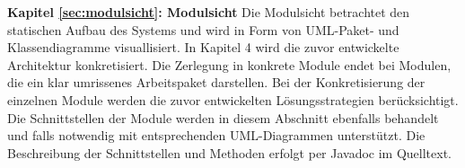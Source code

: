 \textbf{Kapitel \ref{sec:modulsicht}: Modulsicht} %
{Die Modulsicht betrachtet den statischen Aufbau des Systems und wird in Form von UML-Paket- und Klassendiagramme visuallisiert.
In Kapitel 4 wird die zuvor entwickelte Architektur konkretisiert. Die Zerlegung in konkrete Module endet bei Modulen, die ein klar umrissenes Arbeitspaket darstellen. Bei der Konkretisierung der einzelnen Module werden die zuvor entwickelten Lösungsstrategien berücksichtigt.
Die Schnittstellen der Module werden in diesem Abschnitt ebenfalls behandelt und falls notwendig mit entsprechenden UML-Diagrammen unterstützt. Die Beschreibung der Schnittstellen und Methoden erfolgt per Javadoc im Quelltext.}






